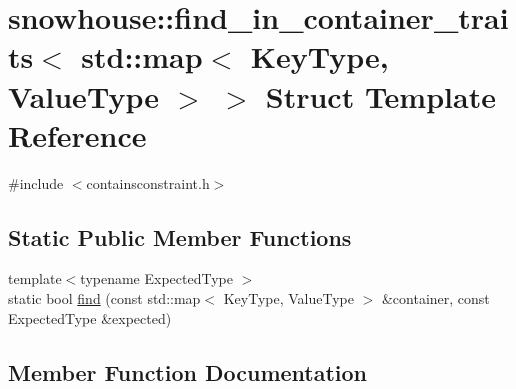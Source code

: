 \hypertarget{structsnowhouse_1_1find__in__container__traits_3_01std_1_1map_3_01KeyType_00_01ValueType_01_4_01_4}{}\section{snowhouse\+::find\+\_\+in\+\_\+container\+\_\+traits$<$ std\+::map$<$ Key\+Type, Value\+Type $>$ $>$ Struct Template Reference}
\label{structsnowhouse_1_1find__in__container__traits_3_01std_1_1map_3_01KeyType_00_01ValueType_01_4_01_4}


{\ttfamily \#include $<$containsconstraint.\+h$>$}

\subsection*{Static Public Member Functions}
\begin{DoxyCompactItemize}
\item 
{\footnotesize template$<$typename Expected\+Type $>$ }\\static bool \mbox{\hyperlink{structsnowhouse_1_1find__in__container__traits_3_01std_1_1map_3_01KeyType_00_01ValueType_01_4_01_4_acc8783959616f7eabe1db0ff1e50e4b8}{find}} (const std\+::map$<$ Key\+Type, Value\+Type $>$ \&container, const Expected\+Type \&expected)
\end{DoxyCompactItemize}


\subsection{Member Function Documentation}
\mbox{\label{structsnowhouse_1_1find__in__container__traits_3_01std_1_1map_3_01KeyType_00_01ValueType_01_4_01_4_acc8783959616f7eabe1db0ff1e50e4b8}} 
